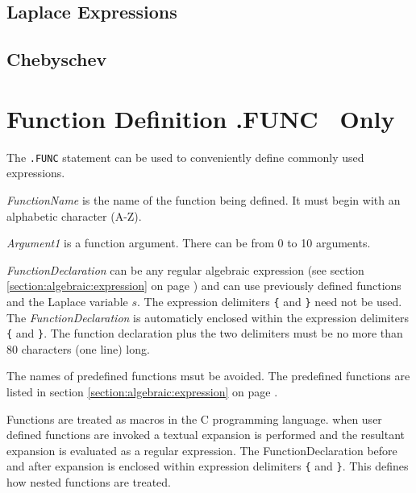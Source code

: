 {\subsection{Laplace Expressions \label{section:laplaceexpressions}}
}
{\subsection{Chebyschev \label{section:chebyschev}}
}
\section{\label{section:function}
Function Definition .FUNC \pspiceninetytwo\ Only}

The {\tt .FUNC} statement can be used to conveniently define
commonly used expressions.

\hspace*{\fill}

{\it FunctionName} is the name of the function being defined.  It
must begin with an alphabetic character (A-Z).

{\it Argument1} is a function argument.
There can be from 0 to 10 arguments.

{\it FunctionDeclaration} can be any regular algebraic expression (see section
\ref{section:algebraic:expression} on page \pageref{section:algebraic:expression})
and can use previously defined functions and the Laplace variable $s$.
The expression delimiters
{\tt \{} and {\tt \}} need not be used.
The {\it FunctionDeclaration} is automaticly enclosed within the expression
delimiters {\tt \{} and {\tt \}}. The function declaration plus the
two delimiters must be no more than 80 characters (one line) long.


The names of predefined functions msut be avoided.  The predefined
functions are listed in section
\ref{section:algebraic:expression} on page \pageref{section:algebraic:expression}.

Functions are treated as macros in the C programming language.
when user defined functions are invoked a textual expansion is
performed and the resultant expansion is evaluated as a regular
expression.  The FunctionDeclaration before and after expansion is
enclosed within expression delimiters {\tt \{} and {\tt \}}.  This
defines how nested functions are treated.

